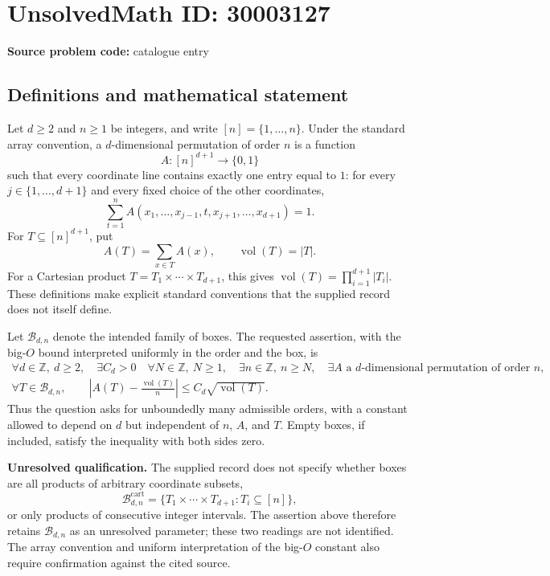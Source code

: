 \documentclass[11pt]{article}
\newcommand{\Z}{\mathbb{Z}}
\begin{document}
\section*{UnsolvedMath ID: 30003127}
\textbf{Source problem code:} catalogue entry
\subsection{Definitions and mathematical statement}
Let \(d\geq 2\) and \(n\geq 1\) be integers, and write \([n]=\{1,\ldots,n\}\). Under the standard array convention, a \(d\)-dimensional permutation of order \(n\) is a function
\[
A:[n]^{d+1}\longrightarrow\{0,1\}
\]
such that every coordinate line contains exactly one entry equal to \(1\): for every \(j\in\{1,\ldots,d+1\}\) and every fixed choice of the other coordinates,
\[
\sum_{t=1}^{n}A(x_1,\ldots,x_{j-1},t,x_{j+1},\ldots,x_{d+1})=1.
\]
For \(T\subseteq[n]^{d+1}\), put
\[
A(T)=\sum_{x\in T}A(x),\qquad \operatorname{vol}(T)=|T|.
\]
For a Cartesian product \(T=T_1\times\cdots\times T_{d+1}\), this gives \(\operatorname{vol}(T)=\prod_{i=1}^{d+1}|T_i|\). These definitions make explicit standard conventions that the supplied record does not itself define.

Let \(\mathcal B_{d,n}\) denote the intended family of boxes. The requested assertion, with the big-\(O\) bound interpreted uniformly in the order and the box, is
\[
\begin{gathered}
\forall d\in\Z,\ d\geq2,\quad \exists C_d>0\quad
\forall N\in\Z,\ N\geq1,\quad \exists n\in\Z,\ n\geq N,\quad
\exists A\text{ a }d\text{-dimensional permutation of order }n,\\
\forall T\in\mathcal B_{d,n},\qquad
\left|A(T)-\frac{\operatorname{vol}(T)}{n}\right|
\leq C_d\sqrt{\operatorname{vol}(T)}.
\end{gathered}
\]
Thus the question asks for unboundedly many admissible orders, with a constant allowed to depend on \(d\) but independent of \(n\), \(A\), and \(T\). Empty boxes, if included, satisfy the inequality with both sides zero.

\textbf{Unresolved qualification.} The supplied record does not specify whether boxes are all products of arbitrary coordinate subsets,
\[
\mathcal B_{d,n}^{\mathrm{cart}}=
\{T_1\times\cdots\times T_{d+1}:T_i\subseteq[n]\},
\]
or only products of consecutive integer intervals. The assertion above therefore retains \(\mathcal B_{d,n}\) as an unresolved parameter; these two readings are not identified. The array convention and uniform interpretation of the big-\(O\) constant also require confirmation against the cited source.
\end{document}
